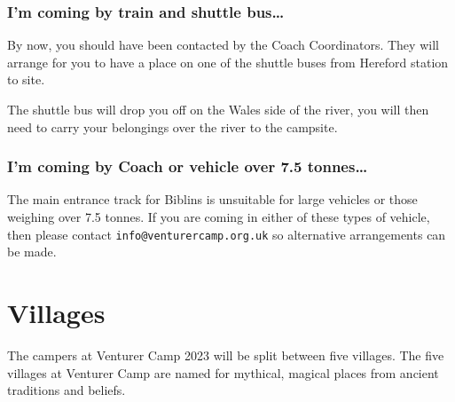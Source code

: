 \documentclass[a4paper, 11pt]{report}
\begin{document}
\subsection{I'm coming by train and shuttle bus\ldots}
By now, you should have been contacted by the Coach Coordinators. They will arrange for you to have a place on one of the shuttle buses from Hereford station to site.\nl

The shuttle bus will drop you off on the Wales side of the river, you will then need to carry your belongings over the river to the campsite. 

\subsection{I'm coming by Coach or vehicle over 7.5 tonnes\ldots}
The main entrance track for Biblins is unsuitable for large vehicles or those weighing over 7.5 tonnes. If you are coming in either of these types of vehicle, then please contact \texttt{info@venturercamp.org.uk} so alternative arrangements can be made.

\chapter{Villages}
The campers at Venturer Camp 2023 will be split between five villages.  The five villages at Venturer Camp are named for mythical, magical places from ancient traditions and beliefs.
\end{document}
